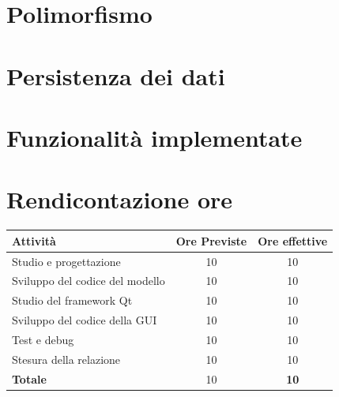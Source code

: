 \documentclass[a4paper, 10pt]{article}
\begin{document}
    \section{Polimorfismo}
    \section{Persistenza dei dati}
    \section{Funzionalità implementate}
    \section{Rendicontazione ore}
    \begin{center}
        \begin{tabular}{|l|c|c|}
            \hline
            \textbf{Attività} & \textbf{Ore Previste} & \textbf{Ore effettive} \\
            \hline
            Studio e progettazione & 10 & 10 \\
            \hline
            Sviluppo del codice del modello & 10 & 10 \\
            \hline
            Studio del framework Qt & 10 & 10 \\
            \hline
            Sviluppo del codice della GUI & 10 & 10 \\
            \hline
            Test e debug & 10 & 10 \\
            \hline
            Stesura della relazione & 10 & 10 \\
            \hline
            \textbf{Totale} & 10 & \textbf{10} \\
            \hline
        \end{tabular}
    \end{center}
\end{document}

